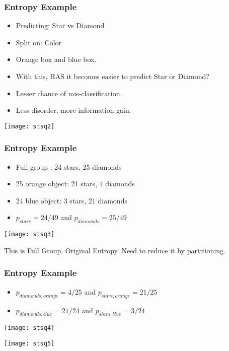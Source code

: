 \begin{frame}[fragile]\frametitle{Entropy Example}

\begin{itemize}
\item Predicting: Star vs Diamond
\item Split on: Color
\item Orange box and blue box.
\item With this, HAS it becomes easier to predict Star or Diamond?
\item Lesser chance of mis-classification. 
\item Less disorder, more information gain.
\end{itemize}
\begin{center}
\texttt{[image: stsq2]}
\end{center}
\end{frame}


\begin{frame}[fragile]\frametitle{Entropy Example}

\begin{itemize}
\item Full group : 24 stars, 25 diamonds
\item 25 orange object: 21 stars, 4 diamonds
\item 24 blue object: 3 stars, 21 diamonds
\item $p_{stars} = 24/49$ and  $p_{diamonds} = 25/49$ 
\end{itemize}
\begin{center}
\texttt{[image: stsq3]}
\end{center}
This is Full Group, Original Entropy. Need to reduce it by partitioning.
\end{frame}

\begin{frame}[fragile]\frametitle{Entropy Example}

\begin{itemize}
\item $p_{diamonds, orange} = 4/25$ and  $p_{stars,orange} = 21/25$ 
\item $p_{diamonds, blue} = 21/24$ and  $p_{stars,blue} = 3/24$ 
\end{itemize}

\begin{center}
\texttt{[image: stsq4]} 

\texttt{[image: stsq5]}
\end{center}
\end{frame}

